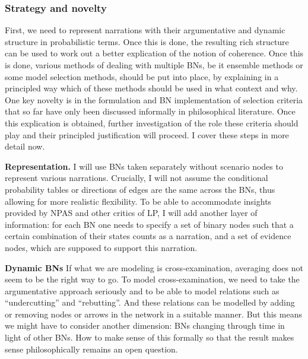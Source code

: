 \documentclass[11pt,dvipsnames,enabledeprecatedfontcommands]{scrartcl}
\begin{document}
\subsubsection{Strategy and novelty}\label{strategy-and-novelty}

First, we need to represent narrations with their argumentative and
dynamic structure in probabilistic terms. Once this is done, the
resulting rich structure can be used to work out a better explication of
the notion of coherence. Once this is done, various methods of dealing
with multiple BNs, be it ensemble methods or some model selection
methods, should be put into place, by explaining in a principled way
which of these methods should be used in what context and why. One key
novelty is in the formulation and BN implementation of selection
criteria that so far have only been discussed informally in
philosophical literature. Once this explication is obtained, further
investigation of the role these criteria should play and their
principled justification will proceed. I cover these steps in more
detail now.

\noindent
\textbf{Representation.} I will use BNs taken separately without
scenario nodes to represent various narrations. Crucially, I will not
assume the conditional probability tables or directions of edges are the
same across the BNs, thus allowing for more realistic flexibility. To be
able to accommodate insights provided by NPAS and other critics of LP, I
will add another layer of information: for each BN one needs to specify
a set of binary nodes such that a certain combination of their states
counts as a narration, and a set of evidence nodes, which are supposed
to support this narration.

\noindent \textbf{Dynamic BNs} If what we are modeling is
cross-examination, averaging does not seem to be the right way to go. To
model cross-examination, we need to take the argumentative approach
seriously and to be able to model relations such as ``undercutting'' and
``rebutting''. And these relations can be modelled by adding or removing
nodes or arrows in the network in a suitable manner. But this means we
might have to consider another dimension: BNs changing through time in
light of other BNs. How to make sense of this formally so that the
result makes sense philosophically remains an open question.
\end{document}
